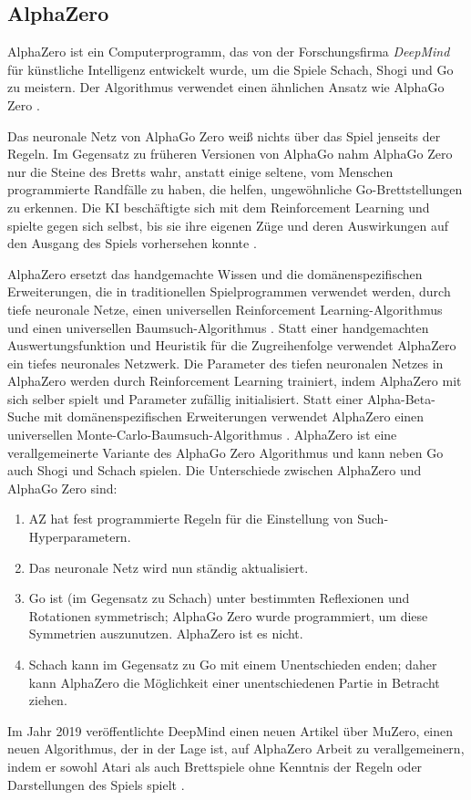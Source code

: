 \subsection{AlphaZero}
AlphaZero ist ein Computerprogramm, das von der Forschungsfirma \textit{DeepMind} für künstliche Intelligenz entwickelt wurde, um die Spiele Schach, Shogi und Go zu meistern. Der Algorithmus verwendet einen ähnlichen Ansatz wie AlphaGo Zero \cite{SilverHubert2017}. 


Das neuronale Netz von AlphaGo Zero weiß nichts über das Spiel jenseits der Regeln. Im Gegensatz zu früheren Versionen von AlphaGo nahm AlphaGo Zero nur die Steine des Bretts wahr, anstatt einige seltene, vom Menschen programmierte Randfälle zu haben, die helfen, ungewöhnliche Go-Brettstellungen zu erkennen. Die KI beschäftigte sich mit dem Reinforcement Learning und spielte gegen sich selbst, bis sie ihre eigenen Züge und deren Auswirkungen auf den Ausgang des Spiels vorhersehen konnte \cite{Greenemeier2017}.


AlphaZero ersetzt das handgemachte Wissen und die domänenspezifischen Erweiterungen, die in traditionellen Spielprogrammen verwendet werden, durch tiefe neuronale Netze, einen universellen Reinforcement Learning-Algorithmus und einen universellen Baumsuch-Algorithmus \cite{Silver2018}. 
Statt einer handgemachten Auswertungsfunktion und Heuristik für die Zugreihenfolge verwendet AlphaZero ein tiefes neuronales Netzwerk. Die Parameter des tiefen neuronalen Netzes in AlphaZero werden durch Reinforcement Learning trainiert, indem AlphaZero mit sich selber spielt und Parameter zufällig initialisiert. Statt einer Alpha-Beta-Suche mit domänenspezifischen Erweiterungen verwendet AlphaZero einen universellen Monte-Carlo-Baumsuch-Algorithmus \cite{Silver2018}. AlphaZero ist eine verallgemeinerte Variante des AlphaGo Zero Algorithmus und kann neben Go auch Shogi und Schach spielen. Die Unterschiede zwischen AlphaZero und AlphaGo Zero sind: \cite{Silver2018}
\begin{enumerate}
	\item AZ hat fest programmierte Regeln für die Einstellung von Such-Hyperparametern.
	\item Das neuronale Netz wird nun ständig aktualisiert.
	\item Go ist (im Gegensatz zu Schach) unter bestimmten Reflexionen und Rotationen symmetrisch; AlphaGo Zero wurde programmiert, um diese Symmetrien auszunutzen. AlphaZero ist es nicht.
	\item Schach kann im Gegensatz zu Go mit einem Unentschieden enden; daher kann AlphaZero die Möglichkeit einer unentschiedenen Partie in Betracht ziehen.
\end{enumerate}
Im Jahr 2019 veröffentlichte DeepMind einen neuen Artikel über MuZero, einen neuen Algorithmus, der in der Lage ist, auf AlphaZero Arbeit zu verallgemeinern, indem er sowohl Atari als auch Brettspiele ohne Kenntnis der Regeln oder Darstellungen des Spiels spielt \cite{Silver2019}. 





